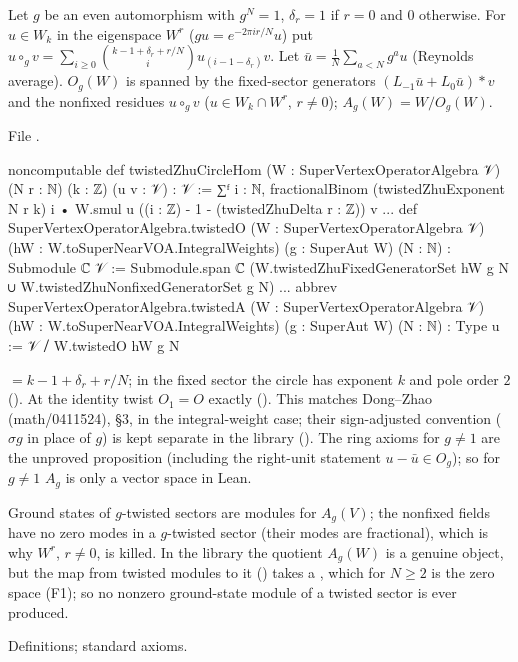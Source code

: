 \begin{definition}\label{l17:def:twistedzhu}
Let $g$ be an even automorphism with $g^N=1$, $\delta_r=1$ if $r=0$ and $0$ otherwise. For $u\in W_k$
in the eigenspace $W^r$ ($gu=e^{-2\pi ir/N}u$) put
$u\circ_gv=\sum_{i\ge0}\binom{k-1+\delta_r+r/N}{i}u_{(i-1-\delta_r)}v$. Let $\bar u=\frac1N\sum_{a<N}g^au$
(Reynolds average). $O_g(W)$ is spanned by the fixed-sector generators $(L_{-1}\bar u+L_0\bar u)\ast v$
and the nonfixed residues $u\circ_gv$ ($u\in W_k\cap W^r$, $r\neq0$); $A_g(W)=W/O_g(W)$.
\end{definition}
\noindent File .
\begin{leancode}
noncomputable def twistedZhuCircleHom (W : SuperVertexOperatorAlgebra 𝒱)
    (N r : ℕ) (k : ℤ) (u v : 𝒱) : 𝒱 :=
  ∑ᶠ i : ℕ, fractionalBinom (twistedZhuExponent N r k) i •
    W.smul u ((i : ℤ) - 1 - (twistedZhuDelta r : ℤ)) v
...
def SuperVertexOperatorAlgebra.twistedO
    (W : SuperVertexOperatorAlgebra 𝒱) (hW : W.toSuperNearVOA.IntegralWeights)
    (g : SuperAut W) (N : ℕ) : Submodule ℂ 𝒱 :=
  Submodule.span ℂ (W.twistedZhuFixedGeneratorSet hW g N ∪
    W.twistedZhuNonfixedGeneratorSet g N)
...
abbrev SuperVertexOperatorAlgebra.twistedA
    (W : SuperVertexOperatorAlgebra 𝒱) (hW : W.toSuperNearVOA.IntegralWeights)
    (g : SuperAut W) (N : ℕ) : Type u := 𝒱 ⧸ W.twistedO hW g N
\end{leancode}
\begin{dictionary}
 $=k-1+\delta_r+r/N$; in the fixed sector the circle has exponent $k$
and pole order $2$ (). At the identity twist $O_1=O$ exactly
(). This matches Dong--Zhao (math/0411524), §3, in the integral-weight case;
their sign-adjusted convention ($\sigma g$ in place of $g$) is kept separate in the library
(). The ring axioms for $g\neq1$ are the unproved proposition
 (including the right-unit statement $u-\bar u\in O_g$); so for $g\ne1$
$A_g$ is only a vector space in Lean.
\end{dictionary}
\begin{physics}
Ground states of $g$-twisted sectors are modules for $A_g(V)$; the nonfixed fields have no zero modes
in a $g$-twisted sector (their modes are fractional), which is why $W^r$, $r\neq0$, is killed.
In the library the quotient $A_g(W)$ is a genuine object, but the map from twisted modules to it
() takes a , which for
$N\ge2$ is the zero space (F1); so no nonzero ground-state module of a twisted sector is ever
produced.
\end{physics}
\begin{status}
Definitions; standard axioms.
\end{status}

